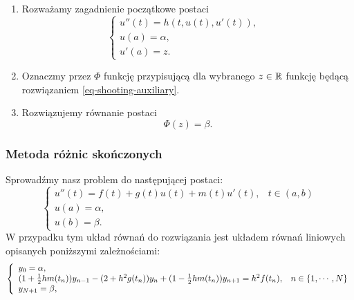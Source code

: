 \documentclass[notheorems]{beamer}
\begin{document}
\begin{frame}
\begin{algorithm}
\begin{enumerate}
\item Rozważamy zagadnienie początkowe postaci
\begin{equation} \label{eq-shooting-auxiliary}
\left\{\begin{array}{ll}
u''(t)=h(t,u(t),u'(t)), & \\
u(a)= \alpha, & \\
u'(a)= z.
\end{array}\right.
\end{equation}
\item Oznaczmy przez $\Phi$ funkcję przypisującą dla wybranego $z \in \mathbb{R}$ funkcję będącą rozwiązaniem \eqref{eq-shooting-auxiliary}.
\item Rozwiązujemy równanie postaci 
$$
\Phi(z) = \beta.
$$ 
\end{enumerate}
\end{algorithm}
\end{frame}
\begin{frame}
\begin{scriptsize}
\frametitle{Metoda różnic skończonych}
Sprowadźmy nasz problem do następującej postaci:
\begin{equation}\label{rownanie_brzegowe}
\left\{\begin{array}{ll}
u''(t)=f(t) + g(t) u(t) + m(t) u'(t), & t \in (a,b) \\
u(a)= \alpha, & \\
u(b)= \beta.
\end{array}\right.
\end{equation}
W przypadku tym układ równań do rozwiązania jest układem równań liniowych opisanych poniższymi zależnościami:
\begin{equation}\label{zagadnienie_liniowe}
\left\{\begin{array}{ll}
y_0 = \alpha, & \\
(1+ \frac{1}{2}h m(t_n))y_{n-1} - (2+ h^2 g(t_n))y_n + (1- \frac{1}{2}h m(t_n))y_{n+1} = h^2 f(t_n) ,& n \in \left\lbrace {1,\cdots,N} \right\rbrace \\
y_{N+1} = \beta,
\end{array}\right. 
\end{equation}
\end{scriptsize}
\end{frame}
\end{document}
